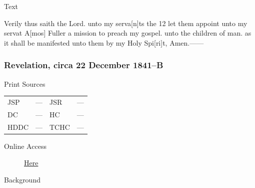 			
			\begin{description}
				\item[Text]
			\end{description}
			
				Verily thus saith the Lord. unto my serva[n]ts the 12 let them appoint unto my servat A[mos] Fuller a mission to preach my gospel. unto the children of man. as it shall be manifested unto them by my Holy Spi[ri]t, Amen.------
				
		\subsubsection{Revelation, circa 22 December 1841--B}
			\label{EMS-1841-JS-22-DEC-1841-B}
				
			\begin{description}
				\item[Print Sources]
			\end{description}	

			\begin{tabular}{p{0.5in}p{1in}p{0.5in}p{1in}}
				JSP	 	& ---		& JSR 		& --- \\
				DC	 	& ---		& HC 		& --- \\
				HDDC 	& ---		& TCHC 		& --- \\
			\end{tabular}
			
			\begin{description}
				\item[Online Access] \href{https://www.josephsmithpapers.org/paper-summary/revelation-circa-22-december-1841-b/1}{Here}
			\end{description}
			
			\begin{description}
				\item[Background]
			\end{description}
			
